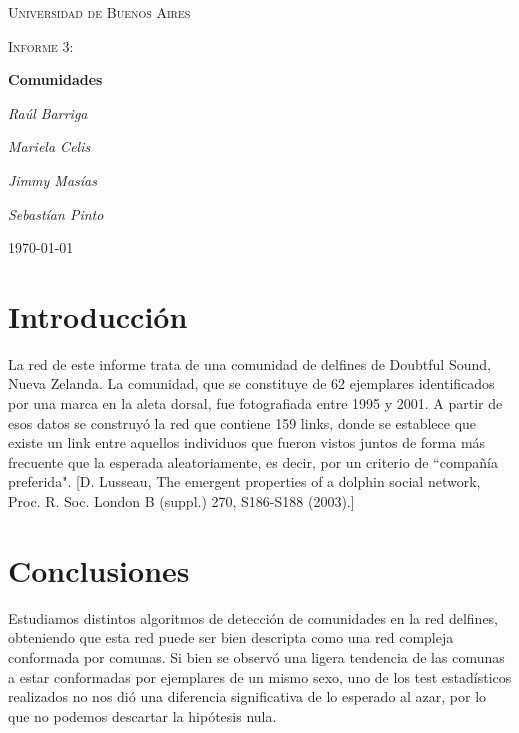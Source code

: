 \documentclass[11pt, spanish]{article}
\begin{document}
\begin{titlepage}
    \centering
    {\scshape\LARGE Universidad de Buenos Aires \par}
    \vspace{1cm}
    {\scshape\Large Informe 3:\par}

    \vspace{1.5cm}
    {\scshape\Large\par}
    {\huge\bfseries  Comunidades\par}
    \vspace{2cm}
    {\Large\itshape Ra\'ul Barriga\par}
    {\Large\itshape Mariela Celis\par}
    {\Large\itshape Jimmy Mas\'ias\par}
    {\Large\itshape Sebast\'ian Pinto\par}

    \vfill

    \vfill

    {\large \today\par}
\end{titlepage}

    \tableofcontents

    \section{Introducción}
    \par La red de este informe trata de una comunidad de delfines de Doubtful Sound, Nueva Zelanda. La comunidad, que se constituye de 62 ejemplares identificados por una marca en la aleta dorsal, fue fotografiada entre 1995 y 2001. A partir de esos datos se construyó la red que contiene 159 links, donde se establece que existe un link entre aquellos individuos que fueron vistos juntos de forma más frecuente que la esperada aleatoriamente, es decir, por un criterio de ``compañía preferida". [D. Lusseau, The emergent properties of a dolphin social network, Proc. R. Soc. London B (suppl.) 270, S186-S188 (2003).]

    
    
    
    
    
    \section{Conclusiones}
    \par Estudiamos distintos algoritmos de detección de comunidades en la red delfines, obteniendo que esta red puede ser bien descripta como una red compleja conformada por comunas. Si bien se observó una ligera tendencia de las comunas a estar conformadas por ejemplares de un mismo sexo, uno de los test estadísticos realizados no nos dió una diferencia significativa de lo esperado al azar, por lo que no podemos descartar la hipótesis nula.
%
%
\end{document}
